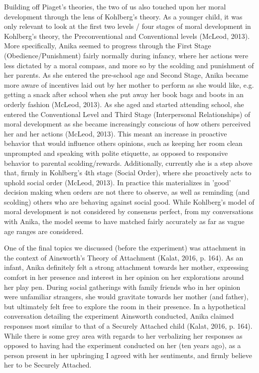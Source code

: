\documentclass[a4paper, 10pt]{article}
\begin{document}
	Building off Piaget's theories, the two of us also touched upon her moral development through the lens of Kohlberg's theory. As a younger child, it was only relevant to look at the first two levels / four stages of moral development in Kohlberg's theory, the Preconventional and Conventional levels (McLeod, 2013). More specifically, Anika seemed to progress through the First Stage (Obedience/Punishment) fairly normally during infancy, where her actions were less dictated by a moral compass, and more so by the scolding and punishment of her parents. As she entered the pre-school age and Second Stage, Anika became more aware of incentives laid out by her mother to perform as she would like, e.g. getting a snack after school when she put away her book bags and boots in an orderly fashion (McLeod, 2013). As she aged and started attending school, she entered the Conventional Level and Third Stage (Interpersonal Relationships) of moral development as she became increasingly conscious of how others perceived her and her actions (McLeod, 2013). This meant an increase in proactive behavior that would influence others opinions, such as keeping her room clean unprompted and speaking with polite etiquette, as opposed to responsive behavior to parental scolding/rewards. Additionally, currently she is a step above that, firmly in Kohlberg's 4th stage (Social Order), where she proactively acts to uphold social order (McLeod, 2013). In practice this materializes in 'good' decision making when orders are not there to observe, as well as reminding (and scolding) others who are behaving against social good. While Kohlberg's model of moral development is not considered by consensus perfect, from my conversations with Anika, the model seems to have matched fairly accurately as far as vague age ranges are considered.
	
	One of the final topics we discussed (before the experiment) was attachment in the context of Ainsworth's Theory of Attachment (Kalat, 2016, p. 164). As an infant, Anika definitely felt a strong attachment towards her mother, expressing comfort in her presence and interest in her opinion on her explorations around her play pen. During social gatherings with family friends who in her opinion were unfamiliar strangers, she would gravitate towards her mother (and father), but ultimately felt free to explore the room in their presence. In a hypothetical conversation detailing the experiment Ainsworth conducted, Anika claimed responses most similar to that of a Securely Attached child (Kalat, 2016, p. 164). While there is some grey area with regards to her verbalizing her responses as opposed to having had the experiment conducted on her (ten years ago), as a person present in her upbringing I agreed with her sentiments, and firmly believe her to be Securely Attached.
	
\end{document}
